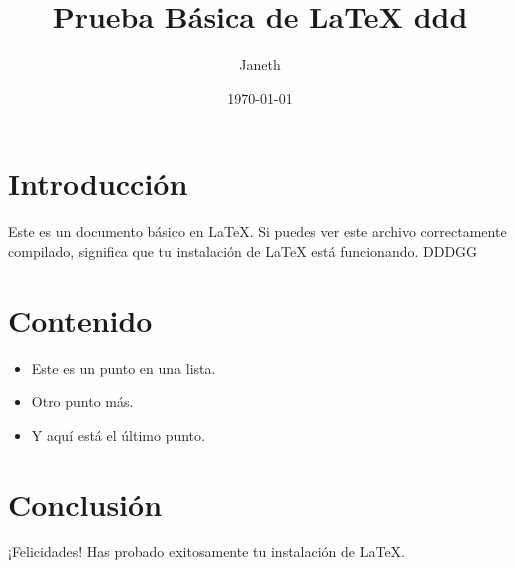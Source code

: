\documentclass{article}
\title{Prueba Básica de LaTeX ddd}
\author{Janeth}
\date{\today}
\begin{document}
\maketitle

\section{Introducción}
Este es un documento básico en \LaTeX. Si puedes ver este archivo correctamente compilado, significa que tu instalación de \LaTeX{} está funcionando.
DDDGG
\section{Contenido}
\begin{itemize}
    \item Este es un punto en una lista.
    \item Otro punto más.
    \item Y aquí está el último punto.
\end{itemize}

\section{Conclusión}
¡Felicidades! Has probado exitosamente tu instalación de \LaTeX.
\end{document}
